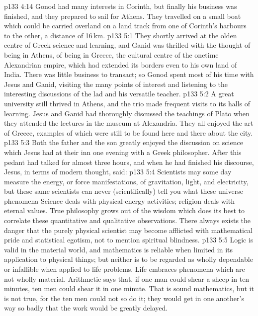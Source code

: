 \vs p133 4:14 Gonod had many interests in Corinth, but finally his business was finished, and they prepared to sail for Athens. They travelled on a small boat which could be carried overland on a land track from one of Corinth’s harbours to the other, a distance of 16\,km.
\vs p133 5:1 They shortly arrived at the olden centre of Greek science and learning, and Ganid was thrilled with the thought of being in Athens, of being in Greece, the cultural centre of the onetime Alexandrian empire, which had extended its borders even to his own land of India. There was little business to transact; so Gonod spent most of his time with Jesus and Ganid, visiting the many points of interest and listening to the interesting discussions of the lad and his versatile teacher.
\vs p133 5:2 A great university still thrived in Athens, and the trio made frequent visits to its halls of learning. Jesus and Ganid had thoroughly discussed the teachings of Plato when they attended the lectures in the museum at Alexandria. They all enjoyed the art of Greece, examples of which were still to be found here and there about the city.
\vs p133 5:3 Both the father and the son greatly enjoyed the discussion on science which Jesus had at their inn one evening with a Greek philosopher. After this pedant had talked for almost three hours, and when he had finished his discourse, Jesus, in terms of modern thought, said:
\vs p133 5:4 \pc Scientists may some day measure the energy, or force manifestations, of gravitation, light, and electricity, but these same scientists can never (scientifically) tell you what these universe phenomena  Science deals with physical\hyp{}energy activities; religion deals with eternal values. True philosophy grows out of the wisdom which does its best to correlate these quantitative and qualitative observations. There always exists the danger that the purely physical scientist may become afflicted with mathematical pride and statistical egotism, not to mention spiritual blindness.
\vs p133 5:5 Logic is valid in the material world, and mathematics is reliable when limited in its application to physical things; but neither is to be regarded as wholly dependable or infallible when applied to life problems. Life embraces phenomena which are not wholly material. Arithmetic says that, if one man could shear a sheep in ten minutes, ten men could shear it in one minute. That is sound mathematics, but it is not true, for the ten men could not so do it; they would get in one another’s way so badly that the work would be greatly delayed.
